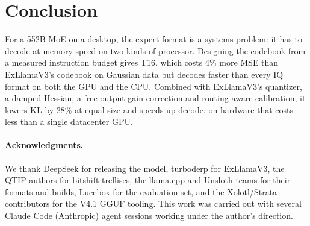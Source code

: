 \documentclass[10pt]{article}
\begin{document}
\section{Conclusion}
For a 552B MoE on a desktop, the expert format is a systems problem: it has to decode at memory speed on two kinds of
processor. Designing the codebook from a measured instruction budget gives T16, which costs 4\% more MSE than
ExLlamaV3's codebook on Gaussian data but decodes faster than every IQ format on both the GPU and the CPU. Combined
with ExLlamaV3's quantizer, a damped Hessian, a free output-gain correction and routing-aware calibration, it lowers KL
by 28\% at equal size and speeds up decode, on hardware that costs less than a single datacenter GPU.

\paragraph{Acknowledgments.}
We thank DeepSeek for releasing the model, turboderp for ExLlamaV3, the QTIP authors for bitshift trellises, the
llama.cpp and Unsloth teams for their formats and builds, Lucebox for the evaluation set, and the Xolotl/Strata
contributors for the V4.1 GGUF tooling. This work was carried out with several Claude Code (Anthropic) agent sessions
working under the author's direction.




\appendix
\end{document}
